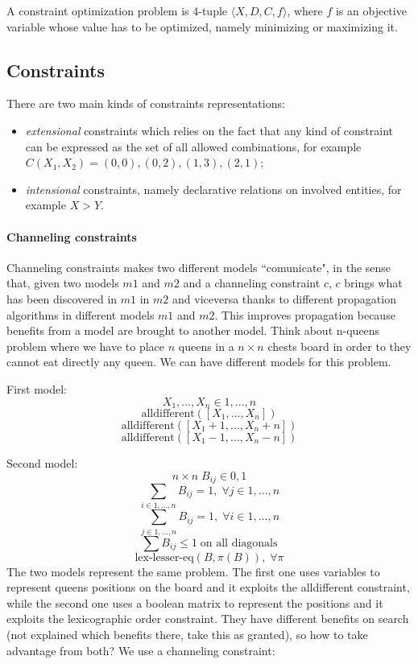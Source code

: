 \documentclass[10pt,a4paper]{article}
\begin{document}
A constraint optimization problem is 4-tuple $ \langle X, D, C, f \rangle $,
where $f$ is an objective variable whose value has to be optimized, namely
minimizing or maximizing it.

\subsection{Constraints}
There are two main kinds of constraints representations:
\begin{itemize}
    \item \textit{extensional} constraints which relies on the fact that any
    kind of constraint can be expressed as the set of all allowed combinations,
    for example $C(X_1, X_2) = {(0,0), (0,2), (1,3), (2,1)}$;
    \item \textit{intensional} constraints, namely declarative relations on
    involved entities, for example $X > Y$.
\end{itemize}

\paragraph{Channeling constraints}
Channeling constraints makes two different models ``comunicate", in the sense
that, given two models $m1$ and $m2$ and a channeling constraint $c$, $c$ brings
what has been discovered in $m1$ in $m2$ and viceversa thanks to different
propagation algorithms in different models $m1$ and $m2$. This improves
propagation because benefits from a model are brought to another model. Think
about n-queens problem where we have to place $n$ queens in a $n \times n$
chests board in order to they cannot eat directly any queen. We can have
different models for this problem.

First model:
\[ X_1, ..., X_n \in {1, ..., n} \]
\[ \textrm{alldifferent}([X_1, ..., X_n]) \]
\[ \textrm{alldifferent}([X_1 + 1, ..., X_n + n]) \]
\[ \textrm{alldifferent}([X_1 - 1, ..., X_n - n]) \]

\pagebreak

Second model:
\[ n \times n \; B_{ij} \in {0, 1} \]
\[ \sum_{i \in {1, ..., n}} B_{ij} = 1, \; \forall j \in {1, ..., n} \]
\[ \sum_{j \in {1, ..., n}} B_{ij} = 1, \; \forall i \in {1, ..., n} \]
\[ \sum B_{ij} \leq 1 \; \textrm{on all diagonals} \]
\[ \textrm{lex-lesser-eq}(B, \pi(B)), \; \forall \pi \]
The two models represent the same problem. The first one uses variables to
represent queens positions on the board and it exploits the alldifferent
constraint, while the second one uses a boolean matrix to represent the
positions and it exploits the lexicographic order constraint. They have
different benefits on search (not explained which benefits there, take this as
granted), so how to take advantage from both? We use a channeling constraint:
\end{document}
